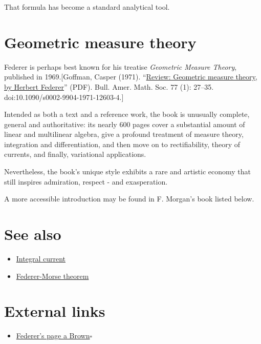 \documentclass{book}
\numberwithin{equation}{section}
\begin{document}
That formula has become a standard analytical tool.
    
\section{Geometric measure theory}
Federer is perhaps best known for his treatise \textit{Geometric Measure Theory}, published in 1969.[Goffman, Casper (1971). ``\href{http://www.ams.org/journals/bull/1971-77-01/S0002-9904-1971-12603-4/S0002-9904-1971-12603-4.pdf}{Review: Geometric measure theory, by Herbert Federer}'' (PDF). Bull. Amer. Math. Soc. 77 (1): 27--35. doi:10.1090/s0002-9904-1971-12603-4.]

Intended as both a text and a reference work, the book is unusually complete, general and authoritative: its nearly 600 pages cover a substantial amount of linear and multilinear algebra, give a profound treatment of measure theory, integration and differentiation, and then move on to rectifiability, theory of currents, and finally, variational applications.

Nevertheless, the book's unique style exhibits a rare and artistic economy that still inspires admiration, respect - and exasperation.

A more accessible introduction may be found in F. Morgan's book listed below.

\section{See also}
\begin{itemize}
    \item \href{https://en.wikipedia.org/wiki/Integral_current}{Integral current}
    \item \href{https://en.wikipedia.org/wiki/Federer-Morse_theorem}{Federer-Morse theorem}
\end{itemize}

\section{External links}
\begin{itemize}
    \item \href{https://web.archive.org/web/20070426204453/http://www.math.brown.edu/faculty/federer.html}{Federer's page a Brown}\hfill$\square$
\end{itemize}

\end{document}
